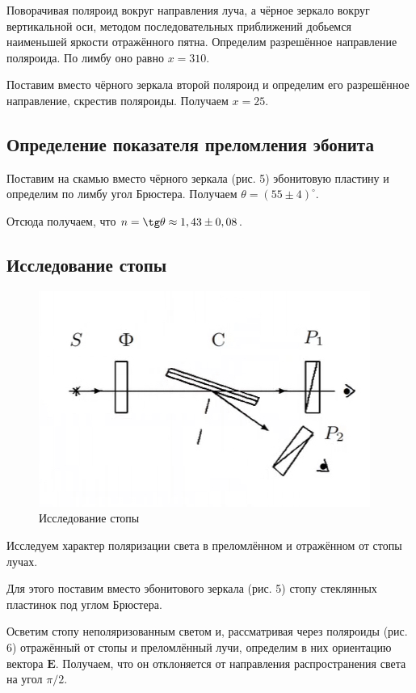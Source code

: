 Поворачивая поляроид вокруг направления луча, а чёрное зеркало вокруг вертикальной оси, методом последовательных приближений добьемся
наименьшей яркости отражённого пятна. Определим разрешённое направление поляроида. По лимбу оно равно $ x = 310 $. 

Поставим вместо чёрного зеркала второй поляроид и определим
его разрешённое направление, скрестив поляроиды. Получаем $ x = 25 $. 

\subsection{Определение показателя преломления эбонита}

Поставим на скамью вместо чёрного зеркала (рис. 5) эбонитовую
пластину и определим по лимбу угол Брюстера. Получаем $ \theta =(55 \pm 4) ^\circ$. 

Отсюда получаем, что $ n = \tg \theta \approx 1,43 \pm 0,08 $. 

\subsection{Исследование стопы}

\begin{figure}
	\includegraphics[width=\linewidth]{6}
	\caption{Исследование стопы}
	\label{ris 6}
\end{figure}

Исследуем характер поляризации света в преломлённом и отражённом от стопы лучах. 

Для этого поставим вместо эбонитового зеркала (рис. 5) стопу стеклянных пластинок под углом Брюстера.

Осветим стопу неполяризованным светом и, рассматривая через поляроиды (рис. 6) отражённый от стопы и преломлённый лучи, определим в них ориентацию вектора $ \mathbf{E} $. Получаем, что он отклоняется от направления распространения света на угол $ \pi/2 $.

